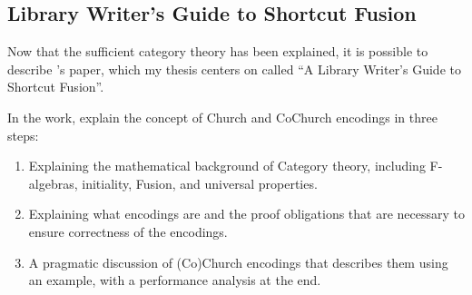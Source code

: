 
\subsection{Library Writer's Guide to Shortcut Fusion}
Now that the sufficient category theory has been explained, it is possible to describe \cite{Harper2011}'s paper, which my thesis centers on called ``A Library Writer's Guide to Shortcut Fusion''.


In the work, \cite{Harper2011} explain the concept of Church and CoChurch encodings in three steps:
\begin{enumerate}
    \item Explaining the mathematical background of Category theory, including F-algebras, initiality, Fusion, and universal properties.
    \item Explaining what encodings are and the proof obligations that are necessary to ensure correctness of the encodings.
    \item A pragmatic discussion of (Co)Church encodings that describes them using an example, with a performance analysis at the end.
\end{enumerate}


\iffalse
\begin{itemize}
    \item 
\end{itemize}
\fi
